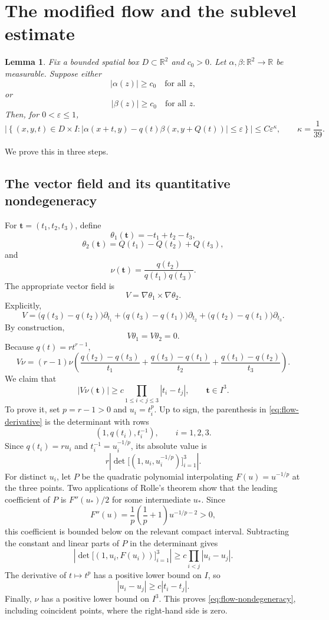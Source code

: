 \documentclass[11pt,a4paper]{article}
\newcommand{\R}{\mathbb R}
\newtheorem{lemma}{Lemma}[section]
\begin{document}
\section{The modified flow and the sublevel estimate}

\begin{lemma}\label{lem:sublevel}
Fix a bounded spatial box $D\subset\R^2$ and $c_0>0$. Let
$\alpha,\beta:\R^2\to\R$ be measurable. Suppose either
\[
|\alpha(z)|\geq c_0\quad\text{for all }z,
\]
or
\[
|\beta(z)|\geq c_0\quad\text{for all }z.
\]
Then, for $0<\varepsilon\leq1$,
\[
\left|\left\{(x,y,t)\in D\times I:
|\alpha(x+t,y)-q(t)\beta(x,y+Q(t))|\leq\varepsilon
\right\}\right|
\leq C\varepsilon^\kappa,
\qquad\kappa=\frac1{39}.
\tag{3.1}\label{eq:sublevel}
\]
\end{lemma}

We prove this in three steps.

\subsection{The vector field and its quantitative nondegeneracy}

For $\mathbf t=(t_1,t_2,t_3)$, define
\[
\theta_1(\mathbf t)=-t_1+t_2-t_3,
\]
\[
\theta_2(\mathbf t)=Q(t_1)-Q(t_2)+Q(t_3),
\]
and
\[
\nu(\mathbf t)=\frac{q(t_2)}{q(t_1)q(t_3)}.
\tag{3.2}\label{eq:flow-coordinates}
\]
The appropriate vector field is
\[
V=\nabla\theta_1\times\nabla\theta_2.
\]
Explicitly,
\[
V=\bigl(q(t_3)-q(t_2)\bigr)\partial_{t_1}
 +\bigl(q(t_3)-q(t_1)\bigr)\partial_{t_2}
 +\bigl(q(t_2)-q(t_1)\bigr)\partial_{t_3}.
\tag{3.3}\label{eq:vector-field}
\]
By construction,
\[
V\theta_1=V\theta_2=0.
\tag{3.4}\label{eq:flow-invariants}
\]
Because $q(t)=rt^{r-1}$,
\[
V\nu=(r-1)\nu\left(
\frac{q(t_2)-q(t_3)}{t_1}
+\frac{q(t_3)-q(t_1)}{t_2}
+\frac{q(t_1)-q(t_2)}{t_3}\right).
\tag{3.5}\label{eq:flow-derivative}
\]
We claim that
\[
|V\nu(\mathbf t)|\geq
c\prod_{1\leq i<j\leq3}|t_i-t_j|,
\qquad\mathbf t\in I^3.
\tag{3.6}\label{eq:flow-nondegeneracy}
\]
To prove it, set $p=r-1>0$ and $u_i=t_i^p$. Up to sign, the parenthesis
in \eqref{eq:flow-derivative} is the determinant with rows
\[
(1,q(t_i),t_i^{-1}),\qquad i=1,2,3.
\]
Since $q(t_i)=ru_i$ and $t_i^{-1}=u_i^{-1/p}$, its absolute value is
\[
r\left|\det\bigl[(1,u_i,u_i^{-1/p})\bigr]_{i=1}^3\right|.
\]
For distinct $u_i$, let $P$ be the quadratic polynomial interpolating
$F(u)=u^{-1/p}$ at the three points. Two applications of Rolle's theorem
show that the leading coefficient of $P$ is $F''(u_*)/2$ for some
intermediate $u_*$. Since
\[
F''(u)=\frac1p\left(\frac1p+1\right)u^{-1/p-2}>0,
\]
this coefficient is bounded below on the relevant compact interval.
Subtracting the constant and linear parts of $P$ in the determinant gives
\[
\left|\det\bigl[(1,u_i,F(u_i))\bigr]_{i=1}^3\right|
\geq c\prod_{i<j}|u_i-u_j|.
\]
The derivative of $t\mapsto t^p$ has a positive lower bound on $I$, so
\[
|u_i-u_j|\geq c|t_i-t_j|.
\]
Finally, $\nu$ has a positive lower bound on $I^3$. This proves
\eqref{eq:flow-nondegeneracy}, including coincident points, where the
right-hand side is zero.
\end{document}

